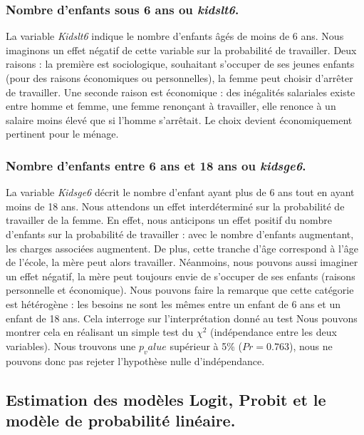 \subsubsection*{Nombre d'enfants sous 6 ans ou \emph{kidslt6}.}

La variable \emph{Kidslt6} indique le nombre d’enfants âgés de moins de 6 ans. Nous imaginons un effet négatif de cette variable sur la probabilité de travailler. Deux raisons : la première est sociologique, souhaitant s’occuper de ses jeunes enfants (pour des raisons économiques ou personnelles), la femme peut choisir d’arrêter de travailler. Une seconde raison est économique : des inégalités salariales existe entre homme et femme, une femme renonçant à travailler, elle renonce à un salaire moins élevé que si l’homme s’arrêtait. Le choix devient économiquement pertinent pour le ménage. 

\subsubsection*{Nombre d'enfants entre 6 ans et 18 ans ou \emph{kidsge6}.}

La variable \emph{Kidsge6} décrit le nombre d’enfant ayant plus de 6 ans tout en ayant moins de 18 ans. Nous attendons un effet interdéterminé sur la probabilité de travailler de la femme. En effet, nous anticipons un effet positif du nombre d’enfants sur la probabilité de travailler : avec le nombre d’enfants augmentant, les charges associées augmentent. De plus, cette tranche d’âge correspond à l’âge de l’école, la mère peut alors travailler. Néanmoins, nous pouvons aussi imaginer un effet négatif, la mère peut toujours envie de s’occuper de ses enfants (raisons personnelle et économique). Nous pouvons faire la remarque que cette catégorie est hétérogène : les besoins ne sont les mêmes entre un enfant de 6 ans et un enfant de 18 ans. Cela interroge sur l’interprétation donné au test Nous pouvons montrer cela en réalisant un simple test du $\chi^2$ (indépendance entre les deux variables). Nous trouvons une $p_value$ supérieur à 5\% ($Pr = 0.763$), nous ne pouvons donc pas rejeter l’hypothèse nulle d’indépendance.




\subsection{Estimation des modèles Logit, Probit et le modèle de probabilité linéaire.}

